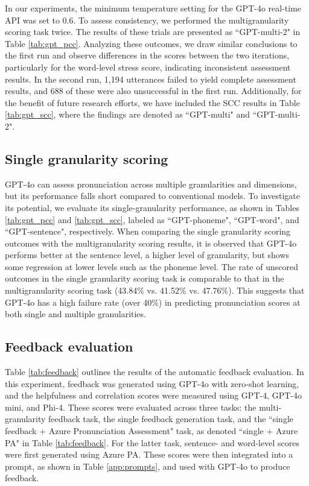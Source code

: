 \documentclass{Interspeech}
\begin{document}
In our experiments, the minimum temperature setting for the GPT-4o real-time API was set to 0.6. To assess consistency, we performed the multigranularity scoring task twice. The results of these trials are presented as ``GPT-multi-2" in Table \ref{tab:gpt_pcc}. Analyzing these outcomes, we draw similar conclusions to the first run and observe differences in the scores between the two iterations, particularly for the word-level stress score, indicating inconsistent assessment results. In the second run, 1,194 utterances failed to yield complete assessment results, and 688 of these were also unsuccessful in the first run. Additionally, for the benefit of future research efforts, we have included the SCC results in Table \ref{tab:gpt_scc}, where the findings are denoted as ``GPT-multi" and ``GPT-multi-2".

\subsection{Single granularity scoring}

GPT-4o can assess pronunciation across multiple granularities and dimensions, but its performance falls short compared to conventional models. To investigate its potential, we evaluate its single-granularity performance, as shown in Tables \ref{tab:gpt_pcc} and \ref{tab:gpt_scc}, labeled as ``GPT-phoneme", ``GPT-word", and ``GPT-sentence", respectively. When comparing the single granularity scoring outcomes with the multigranularity scoring results, it is observed that GPT-4o performs better at the sentence level, a higher level of granularity, but shows some regression at lower levels such as the phoneme level. The rate of unscored outcomes in the single granularity scoring task is comparable to that in the multigranularity scoring task (43.84\% vs. 41.52\% vs. 47.76\%). This suggests that GPT-4o has a high failure rate (over 40\%) in predicting pronunciation scores at both single and multiple granularities.

\subsection{Feedback evaluation}

Table \ref{tab:feedback} outlines the results of the automatic feedback evaluation. In this experiment, feedback was generated using GPT-4o with zero-shot learning, and the helpfulness and correlation scores were measured using GPT-4, GPT-4o mini, and Phi-4. These scores were evaluated across three tasks: the multi-granularity feedback task, the single feedback generation task, and the ``single feedback + Azure Pronunciation Assessment" task, as denoted ``single + Azure PA" in Table \ref{tab:feedback}. For the latter task, sentence- and word-level scores were first generated using Azure PA. These scores were then integrated into a prompt, as shown in Table \ref{app:prompts}, and used with GPT-4o to produce feedback.
\end{document}
